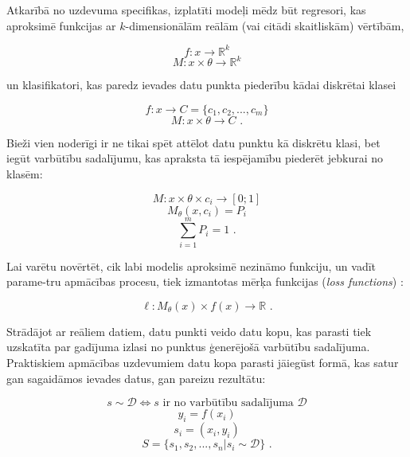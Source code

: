 \documentclass[12pt, a4paper]{article}
\numberwithin{equation}{section} %
\begin{document}
Atkarībā no uzdevuma specifikas, izplatīti modeļi mēdz būt regresori, kas aproksimē funkcijas ar $k$-dimensionālām reālām (vai citādi skaitliskām) vērtībām,

\begin{equation} 
    f:x \rightarrow \mathbb{R}^k
\end{equation}
\begin{equation} 
    M: x \times \theta \rightarrow \mathbb{R}^k
\end{equation}

un klasifikatori, kas paredz ievades datu punkta piederību kādai diskrētai klasei

\begin{equation} 
    f:x \rightarrow C = \lbrace c_1, c_2, ..., c_m \rbrace
\end{equation}
\begin{equation} 
     M: x \times \theta \rightarrow C
\text{ .}
\end{equation}

Bieži vien noderīgi ir ne tikai spēt attēlot datu punktu kā diskrētu klasi, bet iegūt varbūtību sadalījumu, kas apraksta tā iespējamību piederēt jebkurai no klasēm:

\begin{equation} 
    M: x \times \theta \times c_i \rightarrow [0; 1]
\end{equation}
\begin{equation} 
    M_{\theta}(x, c_i) = P_i
\end{equation}
\begin{equation} 
    \sum_{i=1}^m P_i = 1
\text{ .}
\end{equation}

Lai varētu novērtēt, cik labi modelis aproksimē nezināmo funkciju, un vadīt parame-tru apmācības procesu, tiek izmantotas mērķa funkcijas (\textit{loss functions}) \cite{notation}:

\begin{equation} 
    \ell: M_{\theta}(x) \times f(x) \rightarrow \mathbb{R}
\text{ .}
\end{equation}

Strādājot ar reāliem datiem, datu punkti veido datu kopu, kas parasti tiek uzskatīta par gadījuma izlasi no punktus ģenerējošā varbūtību sadalījuma. Praktiskiem apmācības uzdevumiem datu kopa parasti jāiegūst formā, kas satur gan sagaidāmos ievades datus, gan pareizu rezultātu:

\begin{equation} 
    s \sim \mathcal{D} \Leftrightarrow s \text{ ir no varbūtību sadalījuma } \mathcal{D}
\end{equation}
\begin{equation} 
    y_i = f(x_i)
\end{equation}
\begin{equation} 
    s_i = (x_i, y_i)
\end{equation}
\begin{equation} 
    S = \lbrace s_1, s_2, ..., s_n \vert s_i \sim \mathcal{D}\rbrace
\text{ .}
\end{equation}
\end{document}

